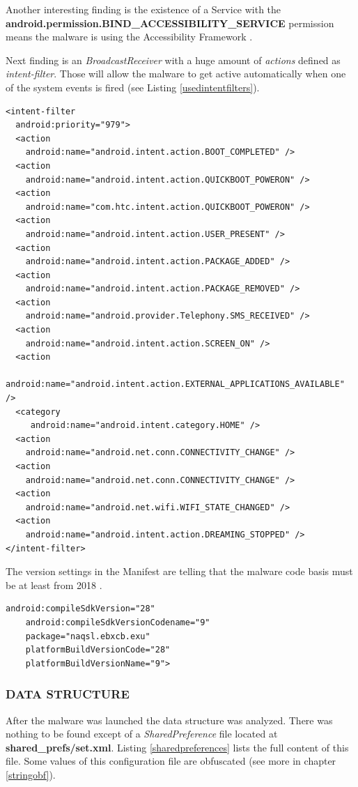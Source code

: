 \documentclass[10pt,titlepage]{article}
\begin{document}
Another interesting finding is the existence of a Service with the \textbf{android.permission.BIND\_ACCESSIBILITY\_SERVICE} permission means the malware is using the Accessibility Framework \cite[/guide/topics/ui/accessibility/service]{AndroidDev}.

Next finding is an \textit{BroadcastReceiver} with a huge amount of \textit{actions} defined as \textit{intent-filter}. Those will allow the malware to get active automatically when one of the system events is fired (see Listing \ref{usedintentfilters}).

\begin{lstlisting}[label=usedintentfilters,caption=Intent filter actions defined in the \textit{AndroidManifest.xml},frame=tb]
<intent-filter
  android:priority="979">
  <action
    android:name="android.intent.action.BOOT_COMPLETED" />
  <action
    android:name="android.intent.action.QUICKBOOT_POWERON" />
  <action
    android:name="com.htc.intent.action.QUICKBOOT_POWERON" />
  <action
    android:name="android.intent.action.USER_PRESENT" />
  <action
    android:name="android.intent.action.PACKAGE_ADDED" />
  <action
    android:name="android.intent.action.PACKAGE_REMOVED" />
  <action
    android:name="android.provider.Telephony.SMS_RECEIVED" />
  <action
    android:name="android.intent.action.SCREEN_ON" />
  <action
    android:name="android.intent.action.EXTERNAL_APPLICATIONS_AVAILABLE" />
  <category
     android:name="android.intent.category.HOME" />
  <action
    android:name="android.net.conn.CONNECTIVITY_CHANGE" />
  <action
    android:name="android.net.conn.CONNECTIVITY_CHANGE" />
  <action
    android:name="android.net.wifi.WIFI_STATE_CHANGED" />
  <action
    android:name="android.intent.action.DREAMING_STOPPED" />
</intent-filter>
\end{lstlisting}

The version settings in the Manifest are telling that the malware code basis must be at least from 2018 \cite[/studio/releases/platforms]{AndroidDev}.

\begin{lstlisting}[label=versionconfiguration,caption=Sdk version configuration defined in the \textit{AndroidManifest.xml},frame=tb]
    android:compileSdkVersion="28"
    android:compileSdkVersionCodename="9"
    package="naqsl.ebxcb.exu"
    platformBuildVersionCode="28"
    platformBuildVersionName="9">
\end{lstlisting}

\subsubsection{DATA STRUCTURE} \label{datastructure}
After the malware was launched the data structure was analyzed. There was nothing to be found except of a \textit{SharedPreference} file located at \textbf{shared\_prefs/set.xml}. Listing \ref{sharedpreferences} lists the full content of this file. Some values of this configuration file are obfuscated (see more in chapter \ref{stringobf}).
\end{document}

